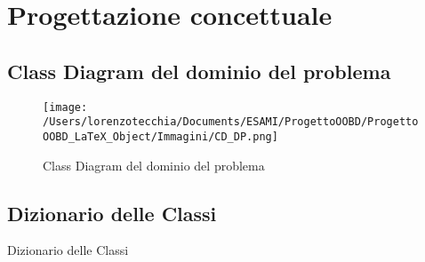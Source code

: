 \chapter{Progettazione concettuale}
    \section{Class Diagram del dominio del problema}
    	\begin{figure}[hbt]
  			\texttt{[image: /Users/lorenzotecchia/Documents/ESAMI/ProgettoOOBD/ProgettoOOBD\_LaTeX\_Object/Immagini/CD\_DP.png]}
  			\caption{Class Diagram del dominio del problema}
	\end{figure}
    \newpage
    \begin{table}[]
\section{Dizionario delle Classi}
\caption{Dizionario delle Classi}


\end{table}
